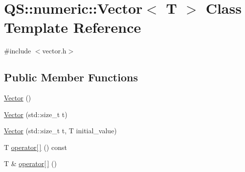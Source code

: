\hypertarget{classQS_1_1numeric_1_1Vector}{\section{Q\-S\-:\-:numeric\-:\-:Vector$<$ T $>$ Class Template Reference}
\label{classQS_1_1numeric_1_1Vector}
}


{\ttfamily \#include $<$vector.\-h$>$}

\subsection*{Public Member Functions}
\begin{DoxyCompactItemize}
\item 
\hyperlink{classQS_1_1numeric_1_1Vector_a863ef1ec5393526c4e65fbefffa5df9d}{Vector} ()
\item 
\hyperlink{classQS_1_1numeric_1_1Vector_aa2070083a917f5c736de8457e486c273}{Vector} (std\-::size\-\_\-t t)
\item 
\hyperlink{classQS_1_1numeric_1_1Vector_a7924f0d54eb07b61fb853a793e9a4763}{Vector} (std\-::size\-\_\-t t, T initial\-\_\-value)
\item 
T \hyperlink{classQS_1_1numeric_1_1Vector_ad2b4cb7bbf2e782df8580ab4ac465860}{operator\mbox{[}$\,$\mbox{]}} () const 
\item 
T \& \hyperlink{classQS_1_1numeric_1_1Vector_a88b0d1f4f8696e236b77d53faa7bcb4e}{operator\mbox{[}$\,$\mbox{]}} ()
\end{DoxyCompactItemize}


